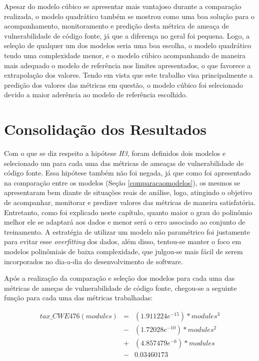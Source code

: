 Apesar do modelo cúbico se apresentar mais vantajoso durante a comparação
realizada, o modelo quadrático também se mostrou como uma boa solução para o
acompanhamento, monitoramento e predição desta métrica de ameaça de
vulnerabilidade de código fonte, já que a diferença no geral foi pequena. Logo,
a seleção de qualquer um dos modelos seria uma boa escolha, o modelo quadrático
tendo uma complexidade menor, e o modelo cúbico acompanhando de maneira
mais adequado o modelo de referência nos limites apresentados, o que favorece a
extrapolação dos valores. Tendo em vista que este trabalho visa principalmente
a predição dos valores das métricas em questão, o modelo cúbico foi selecionado
devido a maior aderência ao modelo de referência escolhido.


\section{Consolidação dos Resultados}\label{consolidacaoresultados}

Com o que se diz respeito a hipótese \textit{H3}, foram definidos dois modelos e
selecionado um para cada uma das métricas de ameaças de vulnerabilidade de
código fonte. Essa hipótese também não foi negada, já que como foi apresentado
na comparação entre os modelos (Seção \ref{comparacaomodelos}), os mesmos se
apresentaram bem diante de situações reais de análise, logo, atingindo o
objetivo de acompanhar, monitorar e predizer valores das métricas de maneira
satisfatória. Entretanto, como foi explicado neste capítulo, quanto maior o grau
do polinômio melhor ele se adaptará aos dados e menor será o erro associado ao
conjunto de treinamento. A estratégia de utilizar um modelo não paramétrico foi
justamente para evitar esse \textit{overfitting} dos dados, além disso,
tentou-se manter o foco em modelos polinômiais de baixa complexidade, que
julgou-se mais fácil de serem incorporados no dia-a-dia do desenvolvimento de
software.

Após a realização da comparação e seleção dos modelos para cada uma das métricas
de ameças de vulnerabilidade de código fonte, chegou-se a seguinte função para
cada uma das métricas trabalhadas:

\begin{align*}
 tax\_CWE476(modules) &=& (1.911224e^{-15}) * modules^{3} \\
                      &-& (1.72028e^{-10}) * modules^{2} \\
                      &+& (4.857479e^{-6}) * modules \\
                      &-& 0.03460173
\end{align*}

